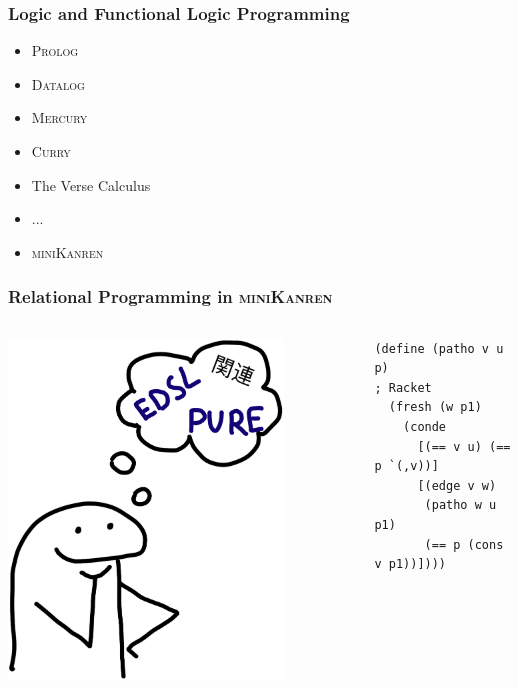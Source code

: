 \documentclass[xcolor={dvipsnames}, aspectratio=169]{beamer}
\newcommand{\mk}{\textsc{miniKanren}\xspace}
\begin{document}
\begin{frame}[fragile]
  \frametitle{Logic and Functional Logic Programming}

\begin{itemize}
  \item \textsc{Prolog}
  \item \textsc{Datalog} 
  \item \textsc{Mercury} 
  \item \textsc{Curry} 
  \item The Verse Calculus
  \item ... 
  \item \mk
\end{itemize}
\end{frame}


\begin{frame}[fragile]
  \frametitle{Relational Programming in \mk}

  \begin{columns}    
    \begin{column}{0.35\textwidth}
      \centering
      \includegraphics[width=0.8\textwidth]{pic/edsl.jpg}
    \end{column}
    \begin{column}{0.75\textwidth}       
\begin{center}
  \begin{minipage}{0.82\textwidth}
    \begin{lstlisting}[language=racket]
(define (patho v u p)                 ; Racket
  (fresh (w p1)
    (conde
      [(== v u) (== p `(,v))]
      [(edge v w)
       (patho w u p1)
       (== p (cons v p1))])))


\end{lstlisting}
\end{minipage}
\end{center}
\end{column}
\end{columns}
\end{frame}
\end{document}

